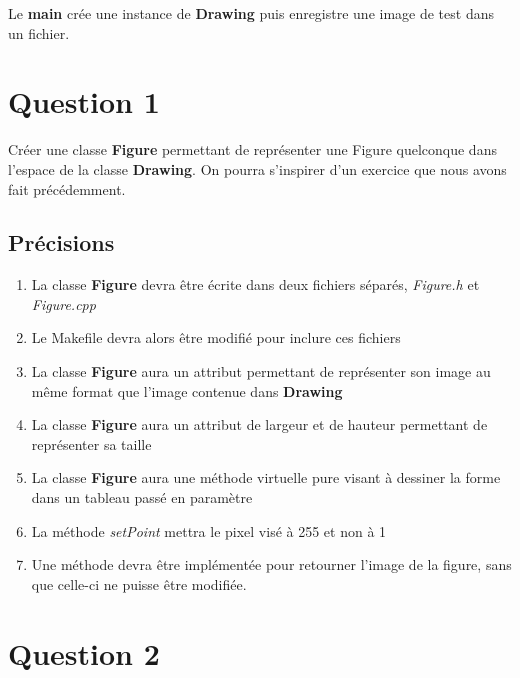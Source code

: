 \documentclass[
	12pt, %
]{fphw}
\begin{document}
Le \textbf{main} crée une instance de \textbf{Drawing} puis enregistre une image de test dans un fichier.



\section*{Question 1}

\begin{problem}
	Créer une classe \textbf{Figure} permettant de représenter une Figure quelconque dans l'espace de la classe \textbf{Drawing}. On pourra s'inspirer d'un exercice que nous avons fait précédemment.
\end{problem}


\subsection*{Précisions}

\begin{enumerate}
	\item La classe \textbf{Figure} devra être écrite dans deux fichiers séparés, \emph{Figure.h} et \emph{Figure.cpp}
	\item Le Makefile devra alors être modifié pour inclure ces fichiers
	\item La classe \textbf{Figure} aura un attribut permettant de représenter son image au même format que l'image contenue dans \textbf{Drawing}
	\item La classe \textbf{Figure} aura un attribut de largeur et de hauteur permettant de représenter sa taille
	\item La classe \textbf{Figure} aura une méthode virtuelle pure visant à dessiner la forme dans un tableau passé en paramètre
	\item La méthode \emph{setPoint} mettra le pixel visé à 255 et non à 1
	\item Une méthode devra être implémentée pour retourner l'image de la figure, sans que celle-ci ne puisse être modifiée.
\end{enumerate}


\section*{Question 2}
\end{document}
